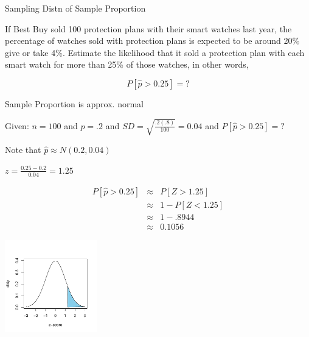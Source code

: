 \documentclass[14pt]{beamer}\usepackage[]{graphicx}\usepackage[]{color}
\begin{document}
\begin{frame}[fragile]{Sampling Distn of Sample Proportion}

If Best Buy sold 100 protection plans with their smart watches last year, the percentage of watches sold with protection plans is expected to be around 20\% give or take 4\%.  Estimate the likelihood that it sold a protection plan with each smart watch  for more  than 25\% of those watches, in other words,

\begin{equation*}
  P[ \hat{p} > 0.25] = ?
\end{equation*}
\end{frame}

\begin{frame}[fragile]{Sample Proportion is approx. normal}

\begin{minipage}[ht]{6cm}

Given: $n = 100$ and $p = .2$ and 
$SD = \sqrt{ \frac{.2(.8)}{100}} = 0.04$ and
$P[ \hat{p} > 0.25] = ?$ 

Note that $\hat{p} \approx N( 0.2, 0.04)$

$z = \frac{0.25 - 0.2}{0.04} = 1.25$

{\small{
\begin{eqnarray*}
P[ \hat{p} > 0.25] & \approx & P[ Z > 1.25] \\
& \approx & 1 - P[Z < 1.25] \\
& \approx & 1 - .8944 \\
& \approx & 0.1056
\end{eqnarray*}
}}
\end{minipage} \hfill
\begin{minipage}[ht]{4cm}


\includegraphics[width=4cm]{figure/LBL8a-1} 


\end{minipage}
\end{frame}
\end{document}
